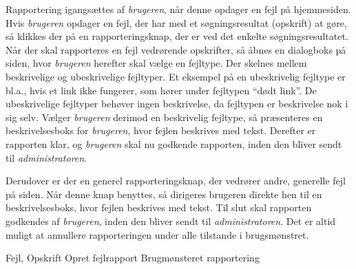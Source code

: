 {Rapportering igangsættes af \textit{brugeren}, når denne opdager en fejl på hjemmesiden. Hvis \textit{brugeren} opdager en fejl, der har med et søgningsresultat (opskrift) at gøre, så klikkes der på en rapporteringsknap, der er ved det enkelte søgningsresultatet. Når der skal rapporteres en fejl vedrørende opskrifter, så åbnes en dialogboks på siden, hvor \textit{brugeren} herefter skal vælge en fejltype. Der skelnes mellem beskrivelige og ubeskrivelige fejltyper. Et eksempel på en ubeskrivelig fejltype er bl.a., hvis et link ikke fungerer, som hører under fejltypen “dødt link”. De ubeskrivelige fejltyper behøver ingen beskrivelse, da fejltypen er beskrivelse nok i sig selv. Vælger \textit{brugeren} derimod en beskrivelig fejltype, så præsenteres en beskrivelsesboks for \textit{brugeren}, hvor fejlen beskrives med tekst. Derefter er rapporten klar, og \textit{brugeren} skal nu godkende rapporten, inden den bliver sendt til \textit{administratoren}.

Derudover er der en generel rapporteringsknap, der vedrører andre, generelle fejl på siden. Når denne knap benyttes, så dirigeres brugeren direkte hen til en beskrivelsesboks, hvor fejlen beskrives med tekst. Til slut skal rapporten godkendes af \textit{brugeren}, inden den bliver sendt til \textit{administratoren}. Det er altid muligt at annullere rapporteringen under alle tilstande i brugsmønstret.}
{Fejl, Opskrift}
{Opret fejlrapport}
{Brugmønsteret rapportering}
